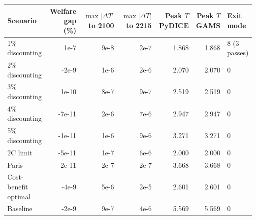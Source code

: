 \begin{tabular}{lrrrrrl}
\toprule
Scenario & Welfare gap (\%) & $\max|\Delta T|$ to 2100 & $\max|\Delta T|$ to 2215 & Peak $T$ PyDICE & Peak $T$ GAMS & Exit mode \\
\midrule
1\% discounting & 1e-7 & 9e-8 & 2e-7 & 1.868 & 1.868 & 8 (3 passes) \\
2\% discounting & -2e-9 & 1e-6 & 2e-6 & 2.070 & 2.070 & 0 \\
3\% discounting & 1e-10 & 8e-7 & 9e-7 & 2.519 & 2.519 & 0 \\
4\% discounting & -7e-11 & 2e-6 & 7e-6 & 2.947 & 2.947 & 0 \\
5\% discounting & -1e-11 & 1e-6 & 9e-6 & 3.271 & 3.271 & 0 \\
2\textdegree{}C limit & -5e-11 & 1e-7 & 6e-6 & 2.000 & 2.000 & 0 \\
Paris & -2e-11 & 2e-7 & 2e-7 & 3.668 & 3.668 & 0 \\
Cost-benefit optimal & -4e-9 & 5e-6 & 2e-5 & 2.601 & 2.601 & 0 \\
Baseline & -2e-9 & 9e-7 & 4e-6 & 5.569 & 5.569 & 0 \\
\bottomrule
\end{tabular}
